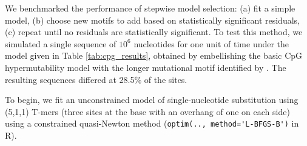 \documentclass{article}
\newcommand{\nA}{\mbox{A}}  %
\newcommand{\nC}{\mbox{C}}
\newcommand{\nG}{\mbox{G}}
\newcommand{\nT}{\mbox{T}}
\theoremstyle{plain}
\theoremstyle{definition}
\begin{document}
We benchmarked the performance of stepwise model selection:
(a) fit a simple model,
(b) choose new motifs to add based on statistically significant residuals,
(c) repeat until no residuals are statistically significant.
To test this method,
we simulated a single sequence of $10^6$ nucleotides
for one unit of time
under the model given in Table \ref{tab:cpg_results},
obtained by embellishing the basic CpG hypermutability model
with the longer mutational motif identified by \citet{harris2015evidence}.
The resulting sequences differed at 28.5\% of the sites.

To begin, we fit an unconstrained model of single-nucleotide substitution using (5,1,1) T-mers
(three sites at the base with an overhang of one on each side)
using a constrained quasi-Newton method (\verb|optim(.., method='L-BFGS-B')| in R).
\end{document}
